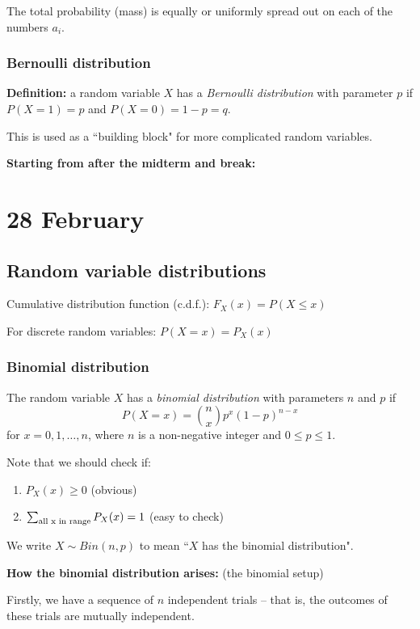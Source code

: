 \documentclass[12pt]{article}
\begin{document}
The total probability (mass) is equally or uniformly spread out on each of the numbers $a_i$. 

\subsubsection{Bernoulli distribution}
\textbf{Definition:} a random variable $X$ has a \emph{Bernoulli distribution} with parameter $p$ if $P(X = 1) = p$ and $P(X = 0) = 1 - p = q$.

This is used as a ``building block" for more complicated random variables. 


\textbf{Starting from after the midterm and break:}

\section{28 February}
\subsection{Random variable distributions}
Cumulative distribution function (c.d.f.): $F_X (x) = P(X \leq x)$

For discrete random variables: $P(X = x) = P_X (x)$

\subsubsection{Binomial distribution}

The random variable $X$ has a \emph{binomial distribution} with parameters $n$ and $p$ if
\[
    P(X = x) = {n \choose x} p^x (1-p)^{n-x}
\]
for $x = 0, 1, \ldots, n$, where $n$ is a non-negative integer and $0 \leq p \leq 1$.

Note that we should check if:
\begin{enumerate}
    \item $P_X (x) \geq 0$ (obvious)
    \item $\sum_{\textnormal{all x in range}} P_X (x) = 1$ (easy to check)
\end{enumerate}

We write $X \sim Bin (n, p)$ to mean ``$X$ has the binomial distribution".

\textbf{How the binomial distribution arises:} (the binomial setup)

Firstly, we have a sequence of $n$ independent trials -- that is, the outcomes of these trials are mutually independent.
\end{document}
